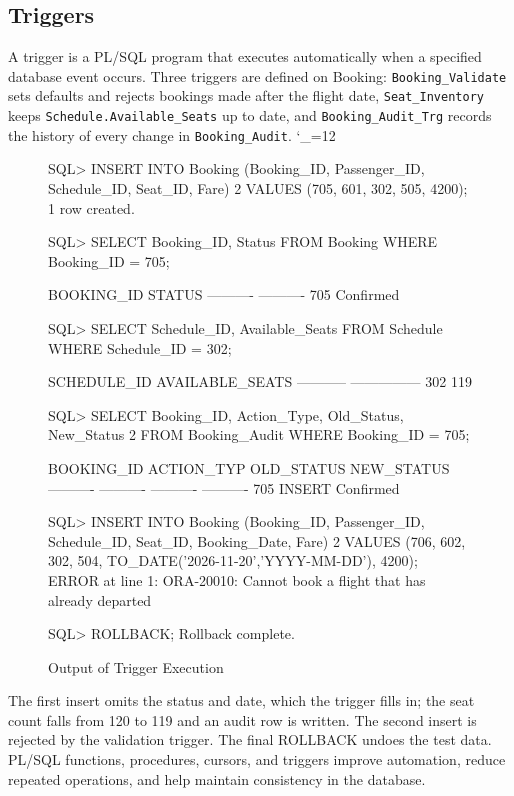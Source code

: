 \documentclass[12pt,a4paper]{article}
\newcommand{\sqlfile}{\begingroup\catcode`\_=12 \sqlfileA}
\newcommand{\sqlfileA}[1]{\endgroup}
\begin{document}
\subsection{Triggers}
A trigger is a PL/SQL program that executes automatically when a specified database event occurs. Three
triggers are defined on Booking: \texttt{Booking\_Validate} sets defaults and rejects bookings made after
the flight date, \texttt{Seat\_Inventory} keeps \texttt{Schedule.Available\_Seats} up to date, and
\texttt{Booking\_Audit\_Trg} records the history of every change in \texttt{Booking\_Audit}.
\sqlfile{07_triggers.sql}
\begin{figure}[H]
\begin{terminal}
SQL> INSERT INTO Booking (Booking_ID, Passenger_ID, Schedule_ID, Seat_ID, Fare)
  2  VALUES (705, 601, 302, 505, 4200);
1 row created.

SQL> SELECT Booking_ID, Status FROM Booking WHERE Booking_ID = 705;

BOOKING_ID STATUS
---------- ----------
       705 Confirmed

SQL> SELECT Schedule_ID, Available_Seats FROM Schedule WHERE Schedule_ID = 302;

SCHEDULE_ID AVAILABLE_SEATS
----------- ---------------
        302             119

SQL> SELECT Booking_ID, Action_Type, Old_Status, New_Status
  2  FROM Booking_Audit WHERE Booking_ID = 705;

BOOKING_ID ACTION_TYP OLD_STATUS NEW_STATUS
---------- ---------- ---------- ----------
       705 INSERT                Confirmed

SQL> INSERT INTO Booking (Booking_ID, Passenger_ID, Schedule_ID, Seat_ID, Booking_Date, Fare)
  2  VALUES (706, 602, 302, 504, TO_DATE('2026-11-20','YYYY-MM-DD'), 4200);
ERROR at line 1:
ORA-20010: Cannot book a flight that has already departed

SQL> ROLLBACK;
Rollback complete.
\end{terminal}
\caption{Output of Trigger Execution}
\end{figure}
The first insert omits the status and date, which the trigger fills in; the seat count falls from 120 to
119 and an audit row is written. The second insert is rejected by the validation trigger. The final
ROLLBACK undoes the test data. PL/SQL functions, procedures, cursors, and triggers improve automation,
reduce repeated operations, and help maintain consistency in the database.

\end{document}
